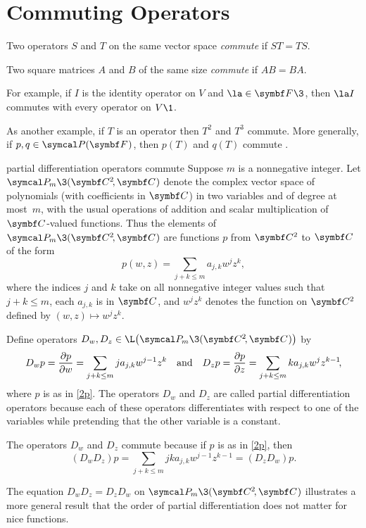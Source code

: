 \section{Commuting Operators} \label{2diagmat}

{\begin{Itemize}
\item
Two operators $S$ and $T$ on the same vector space \emph{commute} if $ST = TS$.
\item
Two square matrices $A$ and $B$ of the same size \emph{commute} if $AB = BA$.
\end{Itemize}}

For example, if $I$ is the identity operator on $V$ and $\la \in \F{}\3$, then $\la I$ commutes with every operator on $V\1$.

As another example, if $T$ is an operator then $T^2$ and $T^3$ commute. More generally, if $p, q \in \P(\F{})$, then $p(T)$ and $q(T)$ commute .

\begin{example}[PD]{partial differentiation operators commute}
Suppose $m$ is a nonnegative integer. Let $\P\!_m\3(\CC2, \C{})$ denote the complex vector space of polynomials (with coefficients in $\C{}$) in two variables and of degree at most~$m$, with the usual operations of addition and scalar multiplication of $\C{}$-valued functions. Thus the elements of $\P\!_m\3(\CC2, \C{})$ are functions $p$ from $\C2$ to $\C{}$ of the form
\begin{equation} \label{2p}
p(w,z) = \sum_{j+k \le m} a_{j,k} w^j z^k\!,
\end{equation}%
where the indices $j$ and $k$ take on all nonnegative integer values such that $j + k \le m$, each
$a_{j,k}$ is in $\C{}$, and $w^j z^k$ denotes the function on $\C2$ defined by $(w, z) \mapsto w^j z^k\!$.

Define operators $D_w, D_z \in \L\paren[\big]{\P\!_m\3(\CC2, \C{})}$ by
\[
D_w p = \frac{ \partial p}{\partial w} = \sum_{j+k \le m} j a_{j,k} w^{j-1} z^k
\andd
D_z p = \frac{ \partial p}{\partial z} = \sum_{j+k \le m} k a_{j,k} w^j z^{k-1}\!,
\]
where $p$ is as in \ref{2p}. The operators $D_w$ and $D_z$ are called partial differentiation operators because each of these operators differentiates with respect to one of the variables while pretending that the other variable is a constant.

The operators $D_w$ and $D_z$ commute because if $p$ is as in \ref{2p}, then
\[
 (D_w D_z)p = \sum_{j+k \le m} j k a_{j,k} w^{j-1} z^{k-1} = (D_z D_w)p.
\]

The equation $D_w D_z = D_z D_w$ on $\P\!_m\3(\CC2, \C{})$ illustrates a more general result that the order of partial differentiation does not matter for nice functions.
\end{example}


